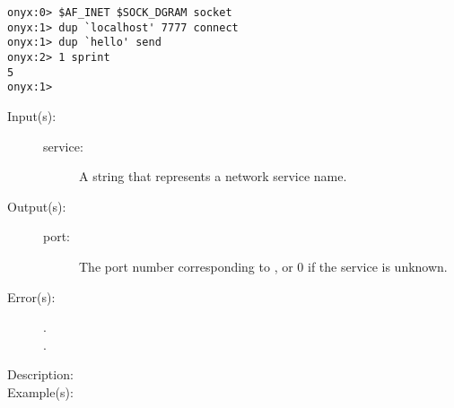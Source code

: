 \begin{description}
\begin{description}
\begin{verbatim}
onyx:0> $AF_INET $SOCK_DGRAM socket
onyx:1> dup `localhost' 7777 connect
onyx:1> dup `hello' send
onyx:2> 1 sprint
5
onyx:1>
		\end{verbatim}
	\end{description}
\label{systemdict:serviceport}
\item[{\onyxop{service}{serviceport}{port}}: ]
	\begin{description}\item[]
	\item[Input(s): ]
		\begin{description}\item[]
		\item[service: ]
			A string that represents a network service name.
		\end{description}
	\item[Output(s): ]
		\begin{description}\item[]
		\item[port: ]
			The port number corresponding to , or 0
			if the service is unknown.
		\end{description}
	\item[Error(s): ]
		\begin{description}\item[]
		\item[.]
		\item[.]
		\end{description}
	\item[Description: ]
	\item[Example(s): ]\begin{verbatim}


\end{verbatim}
\end{description}
\end{description}
